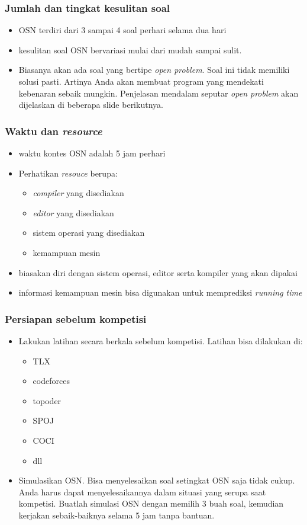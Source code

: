 \begin{frame}
	\frametitle{Jumlah dan tingkat kesulitan soal}
		
	\begin{itemize}
		\item OSN terdiri dari 3 sampai 4 soal perhari selama dua hari
		\item kesulitan soal OSN bervariasi mulai dari mudah sampai sulit.
		\item Biasanya akan ada soal yang bertipe \textit{open problem}. Soal ini tidak memiliki solusi pasti. Artinya Anda akan membuat program yang mendekati kebenaran sebaik mungkin. Penjelasan mendalam seputar \textit{open problem} akan dijelaskan di beberapa slide berikutnya.
	\end{itemize}
\end{frame}

\begin{frame}
	\frametitle{Waktu dan \textit{resource}}
	\begin{itemize}
		\item waktu kontes OSN adalah 5 jam perhari
		\item Perhatikan \textit{resouce} berupa:
		\begin{itemize}
			\item \textit{compiler} yang disediakan
			\item \textit{editor} yang disediakan
			\item sistem operasi yang disediakan
			\item kemampuan mesin
		\end{itemize}
		\item biasakan diri dengan sistem operasi, editor serta kompiler yang akan dipakai
		\item informasi kemampuan mesin bisa digunakan untuk memprediksi \textit{running time}
	\end{itemize}
\end{frame}

\begin{frame}
	\frametitle{Persiapan sebelum kompetisi}
	\begin{itemize}
		\item 	Lakukan latihan secara berkala sebelum kompetisi. Latihan bisa dilakukan di:
		\begin{itemize}
			\item TLX
			\item codeforces
			\item topoder
			\item SPOJ
			\item COCI
			\item dll
		\end{itemize}
		\item Simulasikan OSN. Bisa menyelesaikan soal setingkat OSN saja tidak cukup. Anda harus dapat menyelesaikannya dalam situasi yang serupa saat kompetisi. Buatlah simulasi OSN dengan memilih 3 buah soal, kemudian kerjakan sebaik-baiknya selama 5 jam tanpa bantuan.
	\end{itemize}
\end{frame}

